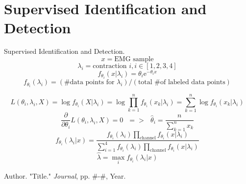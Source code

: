\documentclass[times, 10pt,twocolumn]{article}
\begin{document}
\section{Supervised Identification and Detection}

Supervised Identification and Detection.
\begin{equation}
x = \text{EMG sample}
\end{equation}
\begin{equation}
\lambda_i = \text{contraction }i, i\in[1,2,3,4]
\end{equation}
\begin{equation}
f_{\theta_i}(x|\lambda_i) = \theta_i\mathrm{e}^{-\theta_ix}
\end{equation}
\begin{equation}
f_{\theta_i}(\lambda_i) = (\text{\# data points for }\lambda_i)/(\text{total \# of labeled data points})
\end{equation}


\begin{equation}
L(\theta_i,\lambda_i,X) = \log{f_{\theta_i}(X|\lambda_i)} = \log{\prod_{k=1}^{n}f_{\theta_i}(x_k|\lambda_i)} = \sum_{k=1}^{n}\log{f_{\theta_i}(x_k|\lambda_i)}
\end{equation}
\begin{equation}
\frac{\partial}{\partial{\theta_i}}L(\theta_i,\lambda_i,X) = 0 \text{ } => \text{ } \hat{\theta}_i = \frac{n}{\sum_{k=1}^{n}x_k}
\end{equation}
\begin{equation}
f_{\theta_i}(\lambda_i|x) = \frac{f_{\theta_i}(\lambda_i)\prod_{\text{channel}}f_{\theta_i}(x|\lambda_i)}{\sum_{i=1}^{4}f_{\theta_i}(\lambda_i)\prod_{\text{channel}}f_{\theta_i}(x|\lambda_i)}
\end{equation}
\begin{equation}
\hat{\lambda} = \max_{i}f_{\theta_i}(\lambda_i|x)
\end{equation}



\nocite{ex1,ex2}



\begin{thebibliography}{}\setlength{\itemsep}{-1ex}\small

Author. "Title." \textit{Journal}, pp. \#-\#, Year.

\end{thebibliography}
\end{document}
